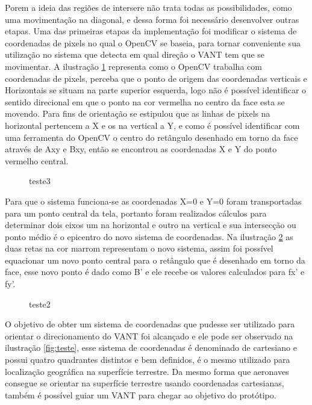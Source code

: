 Porem a ideia das regiões de intersere não trata todas as possibilidades, como uma movimentação na diagonal, e dessa forma foi necessário desenvolver outras etapas. Uma das primeiras etapas da implementação foi modificar o sistema de coordenadas de pixels no qual o OpenCV se baseia, para tornar conveniente sua utilização no sistema que detecta em qual direção o VANT tem que se movimentar. A ilustração \ref{fig:quad1} representa como o OpenCV trabalha com coordenadas de pixels, perceba que o ponto de origem das coordenadas verticais e Horizontais se situam na parte superior esquerda, logo não é possível identificar o sentido direcional em que o ponto na cor vermelha no centro da face esta se movendo. Para fins de orientação se estipulou que as linhas de pixels na horizontal pertencem a X e os na vertical a Y, e como é possível identificar com uma ferramenta do OpenCV o centro do retângulo desenhado em torno da face através de Axy e Bxy, então se encontrou as coordenadas X e Y do ponto vermelho central.

\begin{figure}[H]
	\centering
	\caption{teste3}
	
	\label{fig:quad1}
\end{figure}

Para que o sistema funciona-se as coordenadas X=0 e Y=0 foram transportadas para um ponto central da tela, portanto foram realizados cálculos para determinar dois eixos um na horizontal e outro na vertical e sua intersecção ou ponto médio é o epicentro do novo sistema de coordenadas. Na ilustração \ref{fig:quad2} as duas retas na cor marrom representam o novo sistema, assim foi possível equacionar um novo ponto central para o retângulo que é  desenhado em torno da face, esse novo ponto é dado como B' e ele recebe os valores calculados para fx' e fy'.   

\begin{figure}[H]
	\centering
	\caption{teste2}
	
	\label{fig:quad2}
\end{figure}

O objetivo de obter um sistema de coordenadas que pudesse ser utilizado para orientar o direcionamento do VANT foi alcançado e ele pode ser observado na ilustração \ref{fig:teste}, esse sistema de coordenadas é denominado de cartesiano e possui quatro quadrantes distintos e bem definidos, é o mesmo utilizado para localização geográfica na superfície terrestre. Da mesmo forma que aeronaves consegue se orientar na superfície terrestre usando coordenadas cartesianas, também é possível guiar um VANT para chegar ao objetivo do protótipo.

